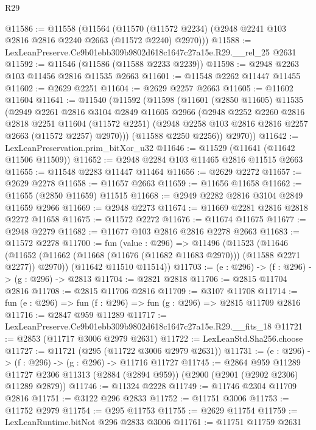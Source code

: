 \begin{lexlean}{R29}
\begin{coremodule}
@11586 := @11558
    (@11564 (@11570 (@11572 @2234) (@2948 @2241 @103 @2816 @2816 @2240 @2663 (@11572 @2240) @2970)))
@11588 := LexLeanPreserve.Ce9b01ebb309b9802d618c1647c27a15e.R29.__rel_25 @2631
@11592 := @11546 (@11586 (@11588 @2233 @2239))
@11598 := @2948 @2263 @103 @11456 @2816 @11535 @2663
@11601 := @11548 @2262 @11447 @11455
@11602 := @2629 @2251
@11604 := @2629 @2257 @2663
@11605 := @11602 @11604
@11641 := @11540
    (@11592
      (@11598
        (@11601
          (@2850 @11605)
          @11535
          (@2949
            @2261
            @2816
            @3104
            @2849
            @11605
            @2966
            (@2948
              @2252
              @2260
              @2816
              @2818
              @2251
              @11604
              (@11572 @2251)
              (@2948 @2258 @103 @2816 @2816 @2257 @2663 (@11572 @2257) @2970)))
          (@11588 @2250 @2256))
        @2970))
@11642 := LexLeanPreservation.prim_bitXor_u32
@11646 := @11529 (@11641 (@11642 @11506 @11509))
@11652 := @2948 @2284 @103 @11465 @2816 @11515 @2663
@11655 := @11548 @2283 @11447 @11464
@11656 := @2629 @2272
@11657 := @2629 @2278
@11658 := @11657 @2663
@11659 := @11656 @11658
@11662 := @11655 (@2850 @11659) @11515
@11668 := @2949 @2282 @2816 @3104 @2849 @11659 @2966
@11669 := @2948 @2273
@11674 := @11669 @2281 @2816 @2818 @2272 @11658
@11675 := @11572 @2272
@11676 := @11674 @11675
@11677 := @2948 @2279
@11682 := @11677 @103 @2816 @2816 @2278 @2663
@11683 := @11572 @2278
@11700 := fun (value : @296) =>
  @11496
    (@11523
      (@11646 (@11652 (@11662 (@11668 (@11676 (@11682 @11683 @2970))) (@11588 @2271 @2277)) @2970))
      (@11642 @11510 @11514))
@11703 := (e : @296) -> (f : @296) -> (g : @296) -> @2813
@11704 := @2821 @2818
@11706 := @2815 @11704 @2816
@11708 := @2815 @11706 @2816
@11709 := @3107 @11708
@11714 := fun (e : @296) => fun (f : @296) => fun (g : @296) => @2815 @11709 @2816
@11716 := @2847 @959 @11289
@11717 := LexLeanPreserve.Ce9b01ebb309b9802d618c1647c27a15e.R29.__fits_18
@11721 := @2853 (@11717 @3006 @2979 @2631)
@11722 := LexLeanStd.Sha256.choose
@11727 := @11721 (@295 (@11722 @3006 @2979 @2631))
@11731 := (e : @296) -> (f : @296) -> (g : @296) -> @11716 @11727
@11745 := @2864
    @959
    @11289
    @11727
    @2306
    @11313
    (@2884 (@2894 @959))
    (@2900 (@2901 (@2902 @2306) @11289 @2879))
@11746 := @11324 @2228
@11749 := @11746 @2304 @11709 @2816
@11751 := @3122 @296 @2833
@11752 := @11751 @3006
@11753 := @11752 @2979
@11754 := @295 @11753
@11755 := @2629 @11754
@11759 := LexLeanRuntime.bitNot @296 @2833 @3006
@11761 := @11751 @11759 @2631

\end{coremodule}
\end{lexlean}
